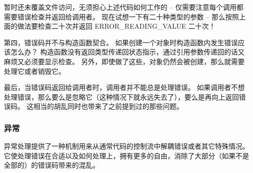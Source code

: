\documentclass[../../LearnCpp.tex]{subfiles}
\begin{document}
暂时还未覆盖文件访问，无须担心上述代码如何工作的 --
仅需要注意每个调用都需要错误检查并返回给调用者。
现在试想一下有二十种类型的参数 --
那么按照上面的做法要检查二十次并返回 ERROR\_READING\_VALUE 二十次！

第四，错误码并不与构造函数契合。
如果创建一个对象时构造函数内发生错误应该怎么办？
构造函数没有返回类型传递回状态指示，通过引用参数传递回的话又麻烦又必须要显示检查。
另外，即使做了这些，对象仍然会被创建，那么就需要处理它或者销毁它。

最后，当错误码返回给调用者时，调用者并不能总是处理错误。
如果调用者不想处理错误，那么要么是忽略它（这种情况下就永远失去了），要么是再向上返回错误码。
这相当的胡乱同时也带来了之前提到过的那些问题。

\subsubsection*{异常}

异常处理提供了一种机制用来从通常代码的控制流中解耦错误或者其它特殊情况。
它使处理错误在合适以及如何处理上，拥有更多的自由，消除了大部分（如果不是全部的）的错误码带来的混乱。
\end{document}
